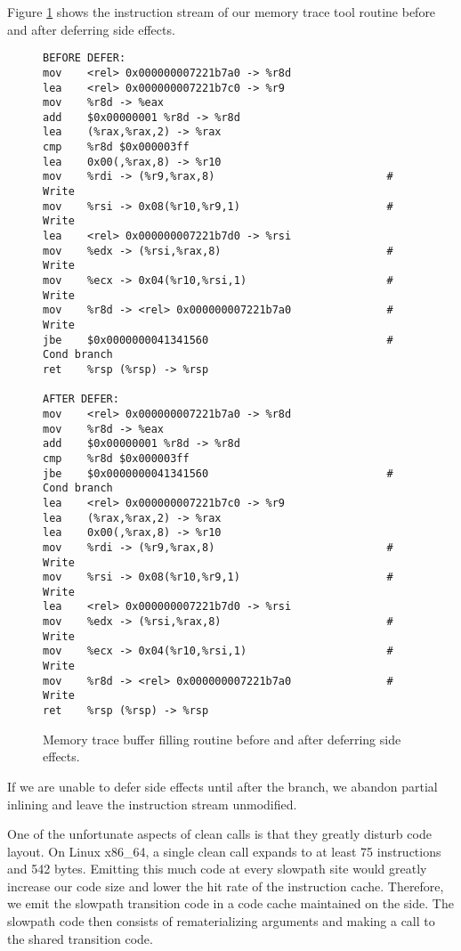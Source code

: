 Figure \ref{fig:memtrace_defer} shows the instruction stream of our memory trace
tool routine before and after deferring side effects.

\begin{figure}
\begin{verbatim}
BEFORE DEFER:
mov    <rel> 0x000000007221b7a0 -> %r8d 
lea    <rel> 0x000000007221b7c0 -> %r9 
mov    %r8d -> %eax 
add    $0x00000001 %r8d -> %r8d 
lea    (%rax,%rax,2) -> %rax 
cmp    %r8d $0x000003ff 
lea    0x00(,%rax,8) -> %r10 
mov    %rdi -> (%r9,%rax,8)                           # Write
mov    %rsi -> 0x08(%r10,%r9,1)                       # Write
lea    <rel> 0x000000007221b7d0 -> %rsi 
mov    %edx -> (%rsi,%rax,8)                          # Write
mov    %ecx -> 0x04(%r10,%rsi,1)                      # Write
mov    %r8d -> <rel> 0x000000007221b7a0               # Write
jbe    $0x0000000041341560                            # Cond branch
ret    %rsp (%rsp) -> %rsp 

AFTER DEFER:
mov    <rel> 0x000000007221b7a0 -> %r8d 
mov    %r8d -> %eax 
add    $0x00000001 %r8d -> %r8d 
cmp    %r8d $0x000003ff 
jbe    $0x0000000041341560                            # Cond branch
lea    <rel> 0x000000007221b7c0 -> %r9 
lea    (%rax,%rax,2) -> %rax 
lea    0x00(,%rax,8) -> %r10 
mov    %rdi -> (%r9,%rax,8)                           # Write
mov    %rsi -> 0x08(%r10,%r9,1)                       # Write
lea    <rel> 0x000000007221b7d0 -> %rsi 
mov    %edx -> (%rsi,%rax,8)                          # Write
mov    %ecx -> 0x04(%r10,%rsi,1)                      # Write
mov    %r8d -> <rel> 0x000000007221b7a0               # Write
ret    %rsp (%rsp) -> %rsp 
\end{verbatim}
\caption{Memory trace buffer filling routine before and after deferring side
effects.}
\label{fig:memtrace_defer}
\end{figure}

If we are unable to defer side effects until after the branch, we abandon
partial inlining and leave the instruction stream unmodified.

One of the unfortunate aspects of clean calls is that they greatly disturb code
layout.  On Linux x86\_64, a single clean call expands to at least 75
instructions and 542 bytes.  Emitting this much code at every slowpath site
would greatly increase our code size and lower the hit rate of the instruction
cache.  Therefore, we emit the slowpath transition code in a code cache
maintained on the side.  The slowpath code then consists of rematerializing
arguments and making a call to the shared transition code.

